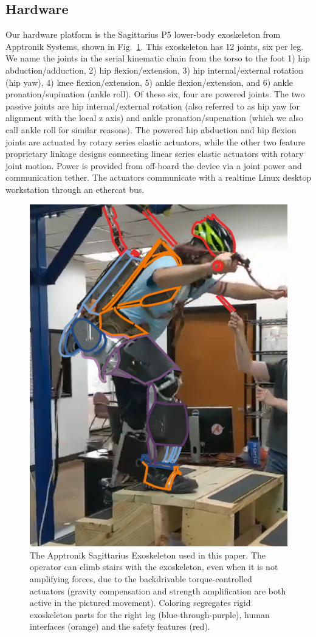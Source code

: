\subsection{Hardware}

Our hardware platform is the Sagittarius P5 lower-body exoskeleton from Apptronik Systems, shown in Fig.~\ref{fig:parts}. This exoskeleton has 12 joints, six per leg. We name the joints in the serial kinematic chain from the torso to the foot 1) hip abduction/adduction, 2) hip flexion/extension, 3) hip internal/external rotation (hip yaw), 4) knee flexion/extension, 5) ankle flexion/extension, and 6) ankle pronation/supination (ankle roll). Of these six, four are powered joints. The two passive joints are hip internal/external rotation (also referred to as hip yaw for alignment with the local z axis) and ankle pronation/supenation (which we also call ankle roll for similar reasons). The powered hip abduction and hip flexion joints are actuated by rotary series elastic actuators, while the other two feature proprietary linkage designs connecting linear series elastic actuators with rotary joint motion. Power is provided from off-board the device via a joint power and communication tether. The actuators communicate with a realtime Linux desktop workstation through an ethercat bus.


\begin{figure}[tb]\centering
	\includegraphics[width=.5\columnwidth]{exo_parts.pdf}%
	\caption{The Apptronik Sagittarius Exoskeleton used in this paper. The operator can climb stairs with the exoskeleton, even when it is not amplifying forces, due to the backdrivable torque-controlled actuators (gravity compensation and strength amplification are both active in the pictured movement). Coloring segregates rigid exoskeleton parts for the right leg (blue-through-purple), human interfaces (orange) and the safety features (red).}\label{fig:parts}
\end{figure}

